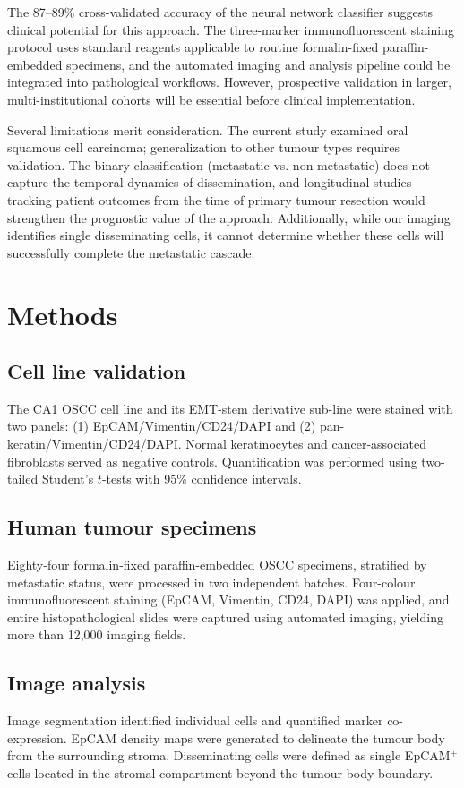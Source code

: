 \documentclass[11pt]{article}
\begin{document}
The 87--89\% cross-validated accuracy of the neural network classifier suggests clinical potential for this approach. The three-marker immunofluorescent staining protocol uses standard reagents applicable to routine formalin-fixed paraffin-embedded specimens, and the automated imaging and analysis pipeline could be integrated into pathological workflows. However, prospective validation in larger, multi-institutional cohorts will be essential before clinical implementation.

Several limitations merit consideration. The current study examined oral squamous cell carcinoma; generalization to other tumour types requires validation. The binary classification (metastatic vs. non-metastatic) does not capture the temporal dynamics of dissemination, and longitudinal studies tracking patient outcomes from the time of primary tumour resection would strengthen the prognostic value of the approach. Additionally, while our imaging identifies single disseminating cells, it cannot determine whether these cells will successfully complete the metastatic cascade.

\section{Methods}

\subsection{Cell line validation}
The CA1 OSCC cell line and its EMT-stem derivative sub-line were stained with two panels: (1) EpCAM/Vimentin/CD24/DAPI and (2) pan-keratin/Vimentin/CD24/DAPI. Normal keratinocytes and cancer-associated fibroblasts served as negative controls. Quantification was performed using two-tailed Student's $t$-tests with 95\% confidence intervals.

\subsection{Human tumour specimens}
Eighty-four formalin-fixed paraffin-embedded OSCC specimens, stratified by metastatic status, were processed in two independent batches. Four-colour immunofluorescent staining (EpCAM, Vimentin, CD24, DAPI) was applied, and entire histopathological slides were captured using automated imaging, yielding more than 12,000 imaging fields.

\subsection{Image analysis}
Image segmentation identified individual cells and quantified marker co-expression. EpCAM density maps were generated to delineate the tumour body from the surrounding stroma. Disseminating cells were defined as single EpCAM$^{+}$ cells located in the stromal compartment beyond the tumour body boundary.
\end{document}
